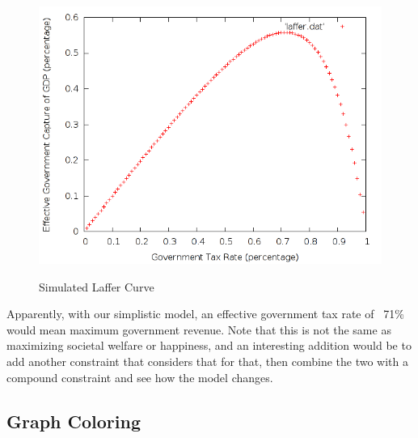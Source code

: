 \documentclass[12pt,a4paper]{article}
\begin{document}
\begin{figure}[H]
\caption{Simulated Laffer Curve}
\centering
\includegraphics[scale=.5]{../demos/laffer.png}
\label{fig:laffer}
\end{figure}

Apparently, with our simplistic model, an effective government tax rate of ~71\% would mean maximum government revenue.  Note that this is not the same as maximizing societal welfare or happiness, and an interesting addition would be to add another constraint that considers that for that, then combine the two with a compound constraint and see how the model changes.

\subsection{Graph Coloring}
\end{document}
